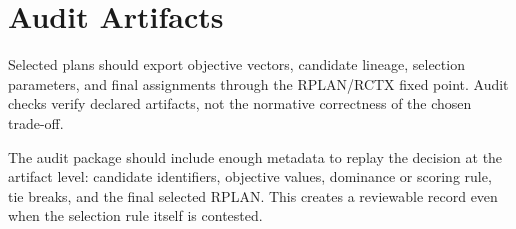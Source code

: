 \section{Audit Artifacts}

Selected plans should export objective vectors, candidate lineage, selection
parameters, and final assignments through the RPLAN/RCTX fixed point. Audit
checks verify declared artifacts, not the normative correctness of the chosen
trade-off.

The audit package should include enough metadata to replay the decision at the
artifact level: candidate identifiers, objective values, dominance or scoring
rule, tie breaks, and the final selected RPLAN. This creates a reviewable
record even when the selection rule itself is contested.
